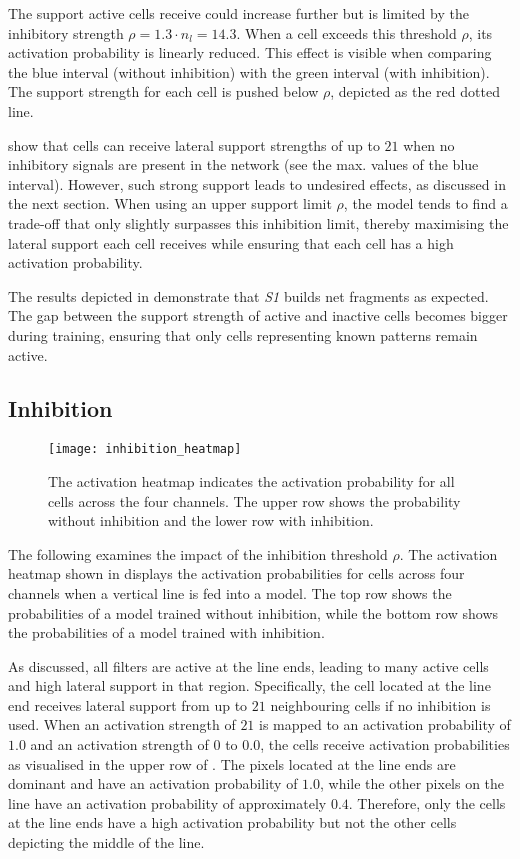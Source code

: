 The support active cells receive could increase further but is limited by the inhibitory strength $\rho = 1.3\cdot n_l = 14.3$.
When a cell exceeds this threshold $\rho$, its activation probability is linearly reduced.
This effect is visible when comparing the blue interval (without inhibition) with the green interval (with inhibition). The support strength for each cell is pushed below $\rho$, depicted as the red dotted line.

 show that cells can receive lateral support strengths of up to $21$ when no inhibitory signals are present in the network (see the max. values of the blue interval).
However, such strong support leads to undesired effects, as discussed in the next section.
When using an upper support limit $\rho$, the model tends to find a trade-off that only slightly surpasses this inhibition limit, thereby maximising the lateral support each cell receives while ensuring that each cell has a high activation probability.

The results depicted in  demonstrate that \emph{S1} builds net fragments as expected. The gap between the support strength of active and inactive cells becomes bigger during training, ensuring that only cells representing known patterns remain active.

\subsection{Inhibition}
%
\begin{figure}[h]
    \centering
    \texttt{[image: inhibition\_heatmap]}
    \caption[Activation heatmap with/without inhibition]{The activation heatmap indicates the activation probability for all cells across the four channels. The upper row shows the probability without inhibition and the lower row with inhibition.}
\end{figure}
%
The following examines the impact of the inhibition threshold $\rho$. The activation heatmap shown in  displays the activation probabilities for cells across four channels when a vertical line is fed into a model.
The top row shows the probabilities of a model trained without inhibition, while the bottom row shows the probabilities of a model trained with inhibition.

As discussed, all filters are active at the line ends, leading to many active cells and high lateral support in that region.
Specifically, the cell located at the line end receives lateral support from up to $21$ neighbouring cells if no inhibition is used.
When an activation strength of $21$ is mapped to an activation probability of $1.0$ and an activation strength of $0$ to $0.0$, the cells receive activation probabilities as visualised in the upper row of .
The pixels located at the line ends are dominant and have an activation probability of $1.0$, while the other pixels on the line have an activation probability of approximately $0.4$.
Therefore, only the cells at the line ends have a high activation probability but not the other cells depicting the middle of the line.


